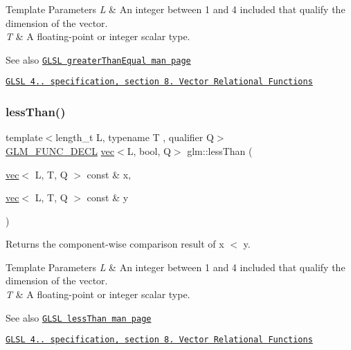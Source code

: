 \begin{DoxyTemplParams}{Template Parameters}
{\em L} & An integer between 1 and 4 included that qualify the dimension of the vector. \\
\hline
{\em T} & A floating-\/point or integer scalar type.\\
\hline
\end{DoxyTemplParams}
\begin{DoxySeeAlso}{See also}
\href{http://www.opengl.org/sdk/docs/manglsl/xhtml/greaterThanEqual.xml}{\tt G\+L\+SL greater\+Than\+Equal man page} 

\href{http://www.opengl.org/registry/doc/GLSLangSpec.4.20.8.pdf}{\tt G\+L\+SL 4.. specification, section 8. Vector Relational Functions} 
\end{DoxySeeAlso}
\mbox{\label{group__core__func__vector__relational_ga314be073c42278ccb6fe7a7958213824}} 
\subsubsection{\texorpdfstring{less\+Than()}{lessThan()}}
{\footnotesize\ttfamily template$<$length\+\_\+t L, typename T , qualifier Q$>$ \\
\hyperlink{setup_8hpp_ab2d052de21a70539923e9bcbf6e83a51}{G\+L\+M\+\_\+\+F\+U\+N\+C\+\_\+\+D\+E\+CL} \hyperlink{structglm_1_1vec}{vec}$<$L, bool, Q$>$ glm\+::less\+Than (\begin{DoxyParamCaption}\item[{\hyperlink{structglm_1_1vec}{vec}$<$ L, T, Q $>$ const \&}]{x,  }\item[{\hyperlink{structglm_1_1vec}{vec}$<$ L, T, Q $>$ const \&}]{y }\end{DoxyParamCaption})}

Returns the component-\/wise comparison result of x $<$ y.


\begin{DoxyTemplParams}{Template Parameters}
{\em L} & An integer between 1 and 4 included that qualify the dimension of the vector. \\
\hline
{\em T} & A floating-\/point or integer scalar type.\\
\hline
\end{DoxyTemplParams}
\begin{DoxySeeAlso}{See also}
\href{http://www.opengl.org/sdk/docs/manglsl/xhtml/lessThan.xml}{\tt G\+L\+SL less\+Than man page} 

\href{http://www.opengl.org/registry/doc/GLSLangSpec.4.20.8.pdf}{\tt G\+L\+SL 4.. specification, section 8. Vector Relational Functions} 
\end{DoxySeeAlso}
\mbox{\label{group__core__func__vector__relational_ga51bf75522dbe1fa5e7806eb9b825ab6a}} 

